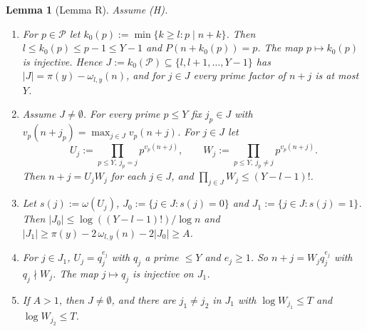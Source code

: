 \documentclass[10pt]{article}
\numberwithin{equation}{section}
\newtheorem{lemma}[theorem]{Lemma}
\theoremstyle{definition}
\theoremstyle{plain}
\newcommand{\cP}{\mathcal{P}}
\begin{document}
\begin{lemma}[Lemma R]\label{lem:R}
Assume \textup{(H)}.
\begin{enumerate}
\item[(i)] For $p\in\cP$ let $k_0(p):=\min\{k\ge l: p\mid n+k\}$. Then $l\le k_0(p)\le p-1\le Y-1$ and
$P(n+k_0(p))=p$. The map $p\mapsto k_0(p)$ is injective. Hence $J:=k_0(\cP)\subseteq\{l,l+1,\dots,Y-1\}$ has
$|J|=\pi(y)-\omega_{l,y}(n)$, and for $j\in J$ every prime factor of $n+j$ is at most $Y$.
\item[(ii)] Assume $J\ne\emptyset$. For every prime $p\le Y$ fix $j_p\in J$ with
$v_p(n+j_p)=\max_{j\in J}v_p(n+j)$. For $j\in J$ let
\[
U_j:=\prod_{p\le Y,\ j_p=j}p^{v_p(n+j)},\qquad W_j:=\prod_{p\le Y,\ j_p\ne j}p^{v_p(n+j)}.
\]
Then $n+j=U_jW_j$ for each $j\in J$, and $\prod_{j\in J}W_j\le (Y-l-1)!$.
\item[(iii)] Let $s(j):=\omega(U_j)$, $J_0:=\{j\in J:s(j)=0\}$ and $J_1:=\{j\in J:s(j)=1\}$. Then
$|J_0|\le\log((Y-l-1)!)/\log n$ and $|J_1|\ge\pi(y)-2\,\omega_{l,y}(n)-2|J_0|\ge A$.
\item[(iv)] For $j\in J_1$, $U_j=q_j^{e_j}$ with $q_j$ a prime $\le Y$ and $e_j\ge1$. So $n+j=W_jq_j^{e_j}$ with
$q_j\nmid W_j$. The map $j\mapsto q_j$ is injective on $J_1$.
\item[(v)] If $A>1$, then $J\ne\emptyset$, and there are $j_1\ne j_2$ in $J_1$ with $\log W_{j_1}\le T$ and
$\log W_{j_2}\le T$.
\end{enumerate}
\end{lemma}
\end{document}
